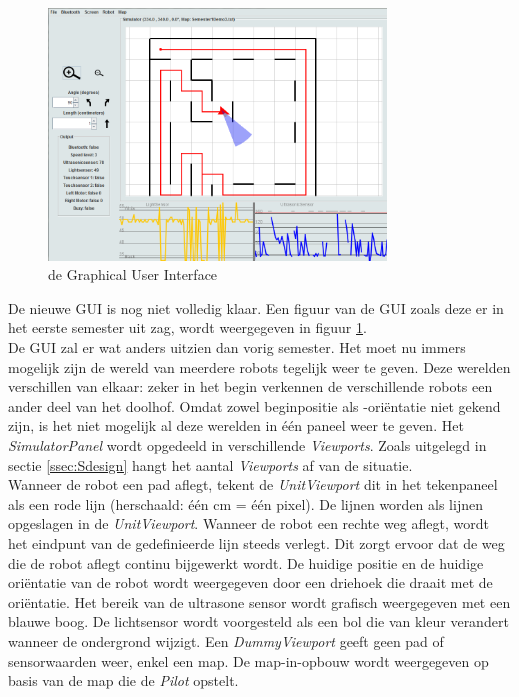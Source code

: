 \documentclass[tt1]{penoverslag}
\begin{document}
\begin{figure}[h]
\centering
	\includegraphics[width=0.8\textwidth]{GUI}
\caption{de Graphical User Interface}
\label{fig:GUI}
\end{figure}

De nieuwe GUI is nog niet volledig klaar. Een figuur van de GUI zoals deze er in het eerste semester uit zag, wordt weergegeven in figuur \ref{fig:GUI}.\\

De GUI zal er wat anders uitzien dan vorig semester. Het moet nu immers mogelijk zijn de wereld van meerdere robots tegelijk weer te geven. Deze werelden verschillen van elkaar: zeker in het begin verkennen de verschillende robots een ander deel van het doolhof. Omdat zowel beginpositie als -ori\"entatie niet gekend zijn, is het niet mogelijk al deze werelden in \'e\'en paneel weer te geven. Het \textit{SimulatorPanel} wordt opgedeeld in verschillende \textit{Viewports}. Zoals uitgelegd in sectie \ref{ssec:Sdesign} hangt het aantal \textit{Viewports} af van de situatie.\\

Wanneer de robot een pad aflegt, tekent de \textit{UnitViewport} dit in het tekenpaneel als een rode lijn (herschaald: \'e\'en cm = \'e\'en pixel). De lijnen worden als lijnen opgeslagen in de \textit{UnitViewport}. Wanneer de robot een rechte weg aflegt, wordt het eindpunt van de gedefinieerde lijn steeds verlegt. Dit zorgt ervoor dat de weg die de robot aflegt continu bijgewerkt wordt. De huidige positie en de huidige ori\"entatie van de robot wordt weergegeven door een driehoek die draait met de ori\"entatie. Het bereik van de ultrasone sensor wordt grafisch weergegeven met een blauwe boog. De lichtsensor wordt voorgesteld als een bol die van kleur verandert wanneer de ondergrond wijzigt. 
Een \textit{DummyViewport} geeft geen pad of sensorwaarden weer, enkel een map. De map-in-opbouw wordt weergegeven op basis van de map die de \textit{Pilot} opstelt.\\
\end{document}
